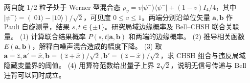 两自旋 \(1/2\) 粒子处于 Werner 型混合态 \(\rho_v=v|\psi^-\rangle\langle\psi^-|+(1-v)I_4/4\)，其中 \(|\psi^-\rangle=(|01\rangle-|10\rangle)/\sqrt2\)，可见度 \(0\le v\le1\)。两端分别沿单位矢量 \(\mathbf a,\mathbf b\) 作 Pauli 自旋测量，结果 \(s,t\in\{\pm1\}\)。研究局域边缘概率及 Bell--CHSH 联合关联量。
(1) 计算联合结果概率 \(P(s,t|\mathbf a,\mathbf b)\) 和两端的边缘概率。
(2) 推导相关函数 \(E(\mathbf a,\mathbf b)\)，解释白噪声混合造成的幅度下降。
(3) 取 \(\mathbf a=\hat z,\mathbf a'=\hat x,\mathbf b=(\hat z+\hat x)/\sqrt2,\mathbf b'=(\hat z-\hat x)/\sqrt2\)，求 CHSH 组合与违反局域隐藏变量界的阈值。
(4) 用算符范数给出量子上界 \(2\sqrt2\)，说明无信号传递与 Bell 违背可以同时成立。
